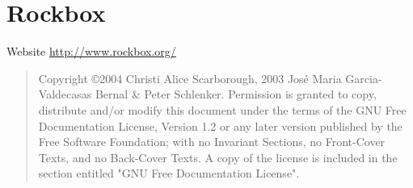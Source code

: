 \chapter*{Rockbox}

\vspace{3cm}
\noindent
\begin{center}
Website \url{http://www.rockbox.org/}
\end{center}

\vspace{\fill}
\begin{quote}
  Copyright \copyright 2004 Christi Alice Scarborough, 2003 Jos\'{e} Maria Garcia-Valdecasas Bernal \& Peter Schlenker.
  Permission is granted to copy, distribute and/or modify this document
  under the terms of the GNU Free Documentation License, Version 1.2
  or any later version published by the Free Software Foundation;
  with no Invariant Sections, no Front-Cover Texts, and no Back-Cover Texts.
  A copy of the license is included in the section entitled "GNU
  Free Documentation License".
\end{quote}